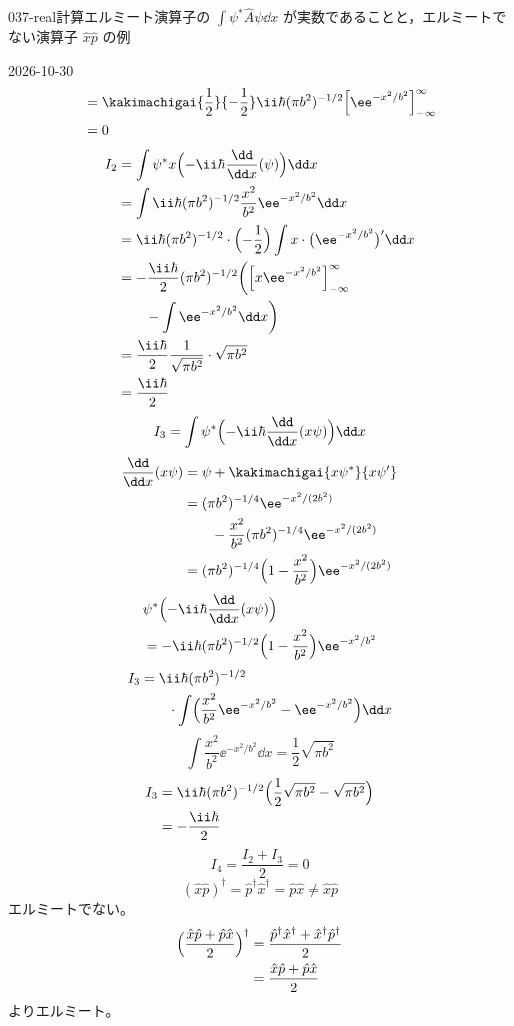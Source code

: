 \documentclass[uplatex,dvipdfmx,a4paper,11pt]{jsarticle}
\begin{document}
\begin{mondai}{037-real}{計算}{エルミート演算子の $\int\psi^{*}\hat{A}\psi\dd x$ が実数であることと，エルミートでない演算子 $\hat{x}\hat{p}$ の例}
\begin{kotaeutsushi}{2026-10-30}
\begin{align*}
&=\kakimachigai{\frac{1}{2}}{-\frac{1}{2}}\ii\hbar(\pi b^{2})^{-1/2}\Bigl[\ee^{-x^{2}/b^{2}}\Bigr]_{-\infty}^{\infty}\\
&=0
\end{align*}
\begin{align*}
I_{2}&=\int\psi^{*}x\Bigl(-\ii\hbar\frac{\dd}{\dd x}(\psi)\Bigr)\dd x\\
&=\int\ii\hbar(\pi b^{2})^{-1/2}\frac{x^{2}}{b^{2}}\ee^{-x^{2}/b^{2}}\dd x\\
&=\ii\hbar(\pi b^{2})^{-1/2}\cdot\Bigl(-\frac{1}{2}\Bigr)\int x\cdot\bigl(\ee^{-x^{2}/b^{2}}\bigr)'\dd x\\
&=-\frac{\ii\hbar}{2}(\pi b^{2})^{-1/2}\biggl(\Bigl[x\ee^{-x^{2}/b^{2}}\Bigr]_{-\infty}^{\infty}\\
&\qquad-\int\ee^{-x^{2}/b^{2}}\dd x\biggr)\\
&=\frac{\ii\hbar}{2}\frac{1}{\sqrt{\pi b^{2}}}\cdot\sqrt{\pi b^{2}}\\
&=\frac{\ii\hbar}{2}
\end{align*}
\[ I_{3}=\int\psi^{*}\Bigl(-\ii\hbar\frac{\dd}{\dd x}(x\psi)\Bigr)\dd x \]
\begin{align*}
\frac{\dd}{\dd x}(x\psi)&=\psi+\kakimachigai{x\psi^{*}}{x\psi'}\\
&=(\pi b^{2})^{-1/4}\ee^{-x^{2}/(2b^{2})}\\
&\qquad-\frac{x^{2}}{b^{2}}(\pi b^{2})^{-1/4}\ee^{-x^{2}/(2b^{2})}\\
&=(\pi b^{2})^{-1/4}\Bigl(1-\frac{x^{2}}{b^{2}}\Bigr)\ee^{-x^{2}/(2b^{2})}
\end{align*}
\begin{align*}
&\psi^{*}\Bigl(-\ii\hbar\frac{\dd}{\dd x}(x\psi)\Bigr)\\
&=-\ii\hbar(\pi b^{2})^{-1/2}\Bigl(1-\frac{x^{2}}{b^{2}}\Bigr)\ee^{-x^{2}/b^{2}}
\end{align*}
\begin{align*}
I_{3}&=\ii\hbar(\pi b^{2})^{-1/2}\\
&\qquad\cdot\int\Bigl(\frac{x^{2}}{b^{2}}\ee^{-x^{2}/b^{2}}-\ee^{-x^{2}/b^{2}}\Bigr)\dd x
\end{align*}
\[ \int\frac{x^{2}}{b^{2}}\ee^{-x^{2}/b^{2}}\dd x=\frac{1}{2}\sqrt{\pi b^{2}} \]
\begin{align*}
I_{3}&=\ii\hbar(\pi b^{2})^{-1/2}\Bigl(\frac{1}{2}\sqrt{\pi b^{2}}-\sqrt{\pi b^{2}}\Bigr)\\
&=-\frac{\ii\hbar}{2}
\end{align*}
\[ I_{4}=\frac{I_{2}+I_{3}}{2}=0 \]
\[ (\hat{x}\hat{p})^{\dagger}=\hat{p}^{\dagger}\hat{x}^{\dagger}=\hat{p}\hat{x}\neq\hat{x}\hat{p} \]
エルミートでない。
\begin{align*}
\Bigl(\frac{\hat{x}\hat{p}+\hat{p}\hat{x}}{2}\Bigr)^{\dagger}
&=\frac{\hat{p}^{\dagger}\hat{x}^{\dagger}+\hat{x}^{\dagger}\hat{p}^{\dagger}}{2}\\
&=\frac{\hat{x}\hat{p}+\hat{p}\hat{x}}{2}
\end{align*}
よりエルミート。


\end{kotaeutsushi}
\end{mondai}
\end{document}
